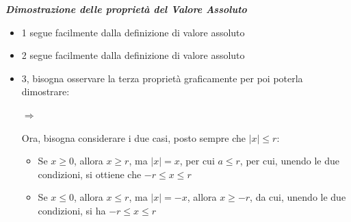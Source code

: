 \documentclass{article}
\theoremstyle{definition}
\begin{document}
\begin{center}
    \textbf{\textit{{Dimostrazione delle proprietà del Valore Assoluto}}}
\end{center}
\begin{itemize}
    \item 1 segue facilmente dalla definizione di valore assoluto
    \item 2 segue facilmente dalla definizione di valore assoluto
    \item 3, bisogna osservare la terza proprietà graficamente per poi poterla dimostrare:
    \begin{center}
   \LARGE$\Longrightarrow$
\end{center}

\begin{center}
\end{center}
Ora, bisogna considerare i due casi, posto sempre che $|x| \leqslant r$:
\begin{itemize}
    \item Se $x \geqslant0$, allora $x \geqslant r$, ma $|x|=x$, per cui $a \leqslant r$, per cui, unendo le due condizioni, si ottiene che $-r \leqslant x \leqslant r$
    \item Se $x \leqslant 0$, allora $x \leqslant r$, ma $|x|=-x$, allora $x \geqslant -r$, da cui, unendo le due condizioni, si ha $-r \leqslant x \leqslant r$
\end{itemize}


\end{itemize}
\end{document}
